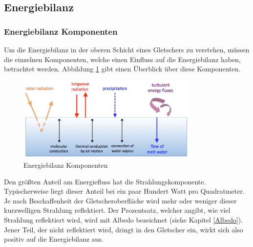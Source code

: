 \documentclass[12pt,a4paper]{article}
\begin{document}
\subsection{Energiebilanz}
\subsubsection{Energiebilanz Komponenten}\label{Energiebilanz Komponenten}
Um die Energiebilanz in der oberen Schicht eines Gletschers zu verstehen, müssen die einzelnen Komponenten, welche einen Einfluss auf die Energiebilanz haben, betrachtet werden. Abbildung \ref{fig:Energiebilanz Komponenten} gibt einen Überblick über diese Komponenten.

\begin{figure}[H]
\centering
\includegraphics[width=0.8\textwidth]{pictures/energy_balance_components.png}
\caption[Energiebilanz Komponenten]{Energiebilanz Komponenten \parencite{Themicroclimateofvalleyglaciers}}
\label{fig:Energiebilanz Komponenten}
\end{figure}

Den größten Anteil am Energiefluss hat die Strahlungskomponente. Typischerweise liegt dieser Anteil bei ein paar Hundert Watt pro Quadratmeter. Je nach Beschaffenheit der Gletscheroberfläche wird mehr oder weniger dieser kurzwelligen Strahlung reflektiert. Der Prozentsatz, welcher angibt, wie viel Strahlung reflektiert wird, wird mit Albedo bezeichnet (siehe Kapitel \ref{Albedo}). Jener Teil, der nicht reflektiert wird, dringt in den Gletscher ein, wirkt sich also positiv auf die Energiebilanz aus.\\
\end{document}
